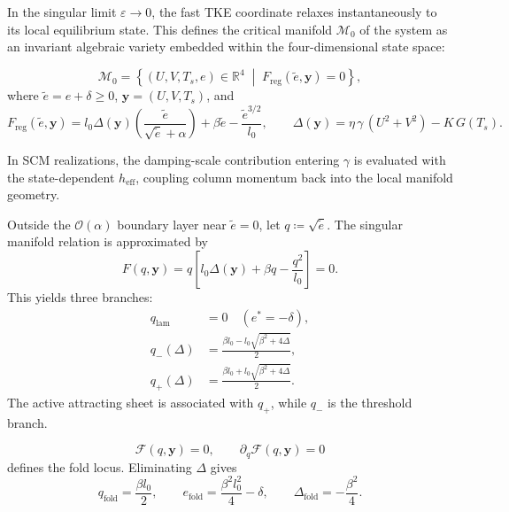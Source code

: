 \documentclass[11pt,letterpaper]{article}
\begin{document}
In the singular limit $\varepsilon \to 0$, the fast TKE coordinate relaxes instantaneously to its local equilibrium state. This defines the critical manifold $\mathcal{M}_0$ of the system as an invariant algebraic variety embedded within the four-dimensional state space:

\begin{equation}
\mathcal{M}_0 = \left\{(U,V,T_s,e) \in \mathbb{R}^4 \;\middle|\; F_{\mathrm{reg}}(\tilde e,\mathbf{y})=0\right\},
\end{equation}
where $\tilde e=e+\delta\ge 0$, $\mathbf{y}=(U,V,T_s)$, and
\begin{equation}
F_{\mathrm{reg}}(\tilde e,\mathbf{y})=l_0\Delta(\mathbf{y})\left(\frac{\tilde e}{\sqrt{\tilde e}+\alpha}\right)+\beta\tilde e-\frac{\tilde e^{3/2}}{l_0},
\qquad
\Delta(\mathbf{y})=\eta\,\gamma\,(U^2+V^2)-K\,G(T_s).
\end{equation}

In SCM realizations, the damping-scale contribution entering $\gamma$ is evaluated with the state-dependent $h_{\text{eff}}$, coupling column momentum back into the local manifold geometry.

Outside the $\mathcal{O}(\alpha)$ boundary layer near $\tilde e=0$, let $q\coloneqq\sqrt{\tilde e}$. The singular manifold relation is approximated by
\begin{equation}
F(q,\mathbf{y})=q\left[l_0\Delta(\mathbf{y})+\beta q-\frac{q^2}{l_0}\right]=0.
\end{equation}
This yields three branches:
\begin{align}
q_{\mathrm{lam}}&=0 \quad (e^*=-\delta),\\
q_{-}(\Delta)&=\frac{\beta l_0-l_0\sqrt{\beta^2+4\Delta}}{2},\\
q_{+}(\Delta)&=\frac{\beta l_0+l_0\sqrt{\beta^2+4\Delta}}{2}.
\end{align}
The active attracting sheet is associated with $q_{+}$, while $q_{-}$ is the threshold branch.

\begin{equation}
\mathcal{F}(q,\mathbf{y})=0,\qquad \partial_q\mathcal{F}(q,\mathbf{y})=0
\label{eq:fold_conditions_unified}
\end{equation}
defines the fold locus. Eliminating $\Delta$ gives
\begin{equation}
q_{\mathrm{fold}}=\frac{\beta l_0}{2},
\qquad
e_{\mathrm{fold}}=\frac{\beta^2 l_0^2}{4}-\delta,
\qquad
\Delta_{\mathrm{fold}}=-\frac{\beta^2}{4}.
\end{equation}
\end{document}
